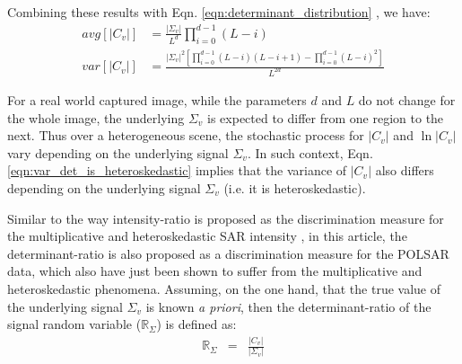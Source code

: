 \documentclass[journal]{IEEEtran}
\begin{document}
Combining these results with Eqn. \ref{eqn:determinant_distribution} %
  , we have:
{\footnotesize
\begin{align}
  avg \left[ |C_v| \right]  &= \frac{|\Sigma_v|}{L^d} \prod^{d-1}_{i=0} (L-i)\\
  var \left[ |C_v| \right]  &=   \frac{|\Sigma_v|^2 \left[ \prod^{d-1}_{i=0} (L-i)(L-i+1) - \prod^{d-1}_{i=0} (L-i)^2 \right] }{L^{2d}} \label{eqn:var_det_is_heteroskedastic}%
\end{align}
}

For a real world captured image, while the parameters $d$ and $L$ do not change for the whole image,
  the underlying $\Sigma_v$ is expected to differ from one region to the next.
Thus over a heterogeneous scene, the stochastic process for $|C_v|$ and $\ln |C_v|$ vary depending on the underlying signal $\Sigma_v$. 
In such context, Eqn. \ref{eqn:var_det_is_heteroskedastic} implies that the variance of $|C_v|$ also differs depending on the underlying signal $\Sigma_v$ (i.e. it is   heteroskedastic).

Similar to the way intensity-ratio is proposed as the discrimination measure for the multiplicative and heteroskedastic SAR intensity \cite{Rignot_1993_TGRS_896},
in this article, the determinant-ratio is also proposed as a discrimination measure for the POLSAR data,
  which also have just been shown to suffer from the multiplicative and heteroskedastic phenomena.
Assuming, on the one hand,
  that the true value of the underlying signal $\Sigma_v$ is known \textit{a priori},
then the determinant-ratio of the signal random variable ($\mathbb{R}_{\Sigma}$) %
  is defined as:
\begin{eqnarray}
  \mathbb{R}_{\Sigma} &=& \frac{|C_v|}{|\Sigma_v|} \label{eqn:determinant_ratio_observables}%
\end{eqnarray}
\end{document}
